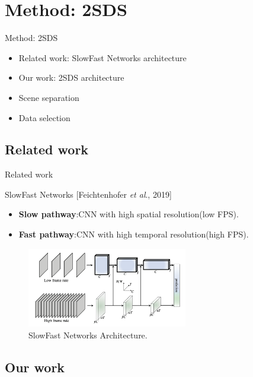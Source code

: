 \documentclass[aspectratio=43,display]{beamer}
\begin{document}
	\section{Method: 2SDS}

		\begin{frame}{Method: 2SDS}

			\begin{itemize}
				\item Related work: SlowFast Networks architecture
				\item Our work: 2SDS architecture
				\item Scene separation
				\item Data selection
			\end{itemize}

		\end{frame}

		\subsection{Related work}

			\begin{frame}{Related work}

				SlowFast Networks [Feichtenhofer \textit{et al}., 2019]

				\begin{itemize}
					\item \textbf{Slow pathway}:CNN with high spatial resolution(low FPS).
					\item \textbf{Fast pathway}:CNN with high temporal resolution(high FPS).
				\end{itemize}

				\begin{figure}
					\includegraphics[width=7cm]{images/slowfast-networks.png}
					\caption{\label{fig:SlowFast-Networks}SlowFast Networks Architecture.}
				\end{figure}

			\end{frame}

		\subsection{Our work}
		
\end{document}
